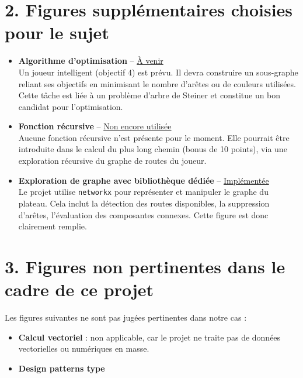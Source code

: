 \section*{2. Figures supplémentaires choisies pour le sujet}

\begin{itemize}
    \item \textbf{Algorithme d’optimisation} – \underline{À venir} \\
    Un joueur intelligent (objectif 4) est prévu. Il devra construire un sous-graphe reliant ses objectifs en minimisant le nombre d’arêtes ou de couleurs utilisées. Cette tâche est liée à un problème d’arbre de Steiner et constitue un bon candidat pour l’optimisation.

    \item \textbf{Fonction récursive} – \underline{Non encore utilisée} \\
    Aucune fonction récursive n’est présente pour le moment. Elle pourrait être introduite dans le calcul du plus long chemin (bonus de 10 points), via une exploration récursive du graphe de routes du joueur.

    \item \textbf{Exploration de graphe avec bibliothèque dédiée} – \underline{Implémentée} \\
    Le projet utilise \texttt{networkx} pour représenter et manipuler le graphe du plateau. Cela inclut la détection des routes disponibles, la suppression d’arêtes, l’évaluation des composantes connexes. Cette figure est donc clairement remplie.

\end{itemize}

\section*{3. Figures non pertinentes dans le cadre de ce projet}

Les figures suivantes ne sont pas jugées pertinentes dans notre cas :

\begin{itemize}
    \item \textbf{Calcul vectoriel} : non applicable, car le projet ne traite pas de données vectorielles ou numériques en masse.
    \item \textbf{Design patterns type}

\end{itemize}
